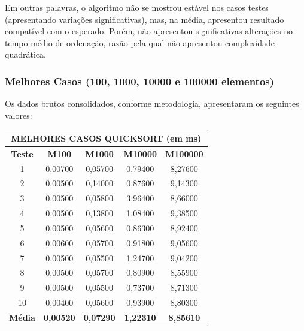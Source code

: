 \documentclass[a4paper, 12pt]{article}
\begin{document}
Em outras palavras, o algoritmo não se mostrou estável nos casos testes (apresentando variações significativas), mas, na média, apresentou resultado compatível com o esperado. Porém, não apresentou significativas alterações no tempo médio de ordenação, razão pela qual não apresentou complexidade quadrática.

\subsubsection{Melhores Casos (100, 1000, 10000 e 100000 elementos)}
\tab{ }Os dados brutos consolidados, conforme metodologia, apresentaram os seguintes valores:
\vspace{0.2cm}

\begin{minipage}{1.05\textwidth}
 \begin{minipage}[c]{0.46\textwidth}
 \centering 
\begin{tabular}{ccccc}
   \multicolumn{ 5}{c}{{\bf MELHORES CASOS QUICKSORT (em ms)}} \\
\hline
{\bf Teste} & {\bf M100} & {\bf M1000} & {\bf M10000} & {\bf M100000} \\
\hline
         1 &    0,00700 &    0,05700 &    0,79400 &    8,27600 \\
\hline
         2 &    0,00500 &    0,14000 &    0,87600 &    9,14300 \\
\hline
         3 &    0,00500 &    0,05800 &    3,96400 &    8,66000 \\
\hline
         4 &    0,00500 &    0,13800 &    1,08400 &    9,38500 \\
\hline
         5 &    0,00500 &    0,05600 &    0,86300 &    8,92400 \\
\hline
         6 &    0,00600 &    0,05700 &    0,91800 &    9,05600 \\
\hline
         7 &    0,00500 &    0,05500 &    1,24700 &    9,04200 \\
\hline
         8 &    0,00500 &    0,05700 &    0,80900 &    8,55900 \\
\hline
         9 &    0,00500 &    0,05500 &    0,73700 &    8,71300 \\
\hline
        10 &    0,00400 &    0,05600 &    0,93900 &    8,80300 \\
\hline
{\bf Média} & {\bf 0,00520} & {\bf 0,07290} & {\bf 1,22310} & {\bf 8,85610} \\
\hline
\end{tabular}  
\end{minipage}\hfill
\begin{minipage}[c]{0.49\textwidth}
\centering
{}
\end{minipage}
\end{minipage}\hfill
\end{document}
